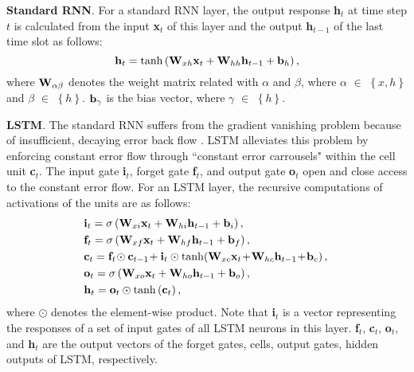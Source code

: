 \documentclass[journal]{IEEEtran}
\begin{document}
\textbf{Standard RNN}. For a standard RNN layer, the output response \textbf{{h}$_t$} at time step $t$ is calculated from the input \textbf{{x}$_t$} of this layer and the output \textbf{{h}$_{t-1}$} of the last time slot as follows:
\begin{equation}
\label{equ:rnn}
{{\bf{h}}_{t}} = \tanh \left( {{\bf{W}}_{xh}}{{\bf{x}}_{t}} + {{\bf{W}}_{hh}}{{\bf{h}}_{t-1} + {\bf{b}}_h} \right),
\end{equation}
where ${\bf{W}}_{\alpha\beta}$ denotes the weight matrix related with $\alpha$ and $\beta$, where $\alpha$ $\in$ $\left\{ x, h \right\}$ and $\beta$ $\in$ $\left\{h \right\}$. $\bf{b}_{\gamma}$ is the bias vector, where $\gamma$ $\in$ $\left\{h \right\}$. 

\textbf{LSTM}. The standard RNN suffers from the gradient vanishing problem because of insufficient, decaying error back flow \cite{hochreiter1997long}. LSTM alleviates this problem by enforcing constant error flow through ``constant error carrousels" within the cell unit \textbf{{c}$_t$}. The input gate \textbf{{i}$_t$}, forget gate \textbf{{f}$_t$}, and output gate \textbf{{o}$_t$} open and close access to the constant error flow. For an LSTM layer, the recursive computations of activations of the units are as follows:
\begin{eqnarray}
\label{equ:lstm}
\begin{aligned}
\!&{\bf{i}}_t = \sigma \left( {{\bf{W}}_{xi}}{{\bf{x}}_{t}} + {{\bf{W}}_{hi}}{\bf{h}}_{t-1} + {\bf{b}}_i \right), \\ 
\!&{\bf{f}}_t = \sigma \left( {{\bf{W}}_{xf}}{{\bf{x}}_{t}} + {{\bf{W}}_{hf}}{\bf{h}}_{t-1} + {\bf{b}}_f \right), \\
\!&{\bf{c}}_t = {\bf{f}}_t\!\odot {\bf{c}}_{t-1}\!+{\bf{i}}_t \odot \tanh\! \left( {{\bf{W}}_{xc}}{{\bf{x}}_{t}}\! +\! {{\bf{W}}_{hc}}{\bf{h}}_{t-1} \!+\! {\bf{b}}_c \right), \\ 
\!&{\bf{o}}_t = \sigma \left( {{\bf{W}}_{xo}}{{\bf{x}}_{t}} + {{\bf{W}}_{ho}}{\bf{h}}_{t-1} + {\bf{b}}_o \right), \\
\!&{\bf{h}}_t = {\bf{o}}_t \odot \tanh \left( {\bf{c}}_t \right),
\end{aligned}
\end{eqnarray}
where $\odot$ denotes the element-wise product. Note that \textbf{{i}$_t$} is a vector representing the responses of a set of input gates of all LSTM neurons in this layer. \textbf{f$_t$}, \textbf{c$_t$}, \textbf{o$_t$}, and \textbf{h$_t$} are the output vectors of the forget gates, cells, output gates, hidden outputs of LSTM, respectively.
\end{document}
